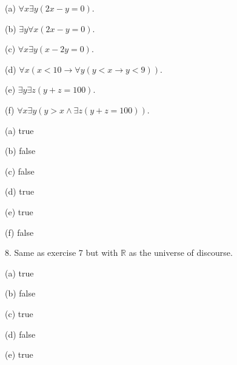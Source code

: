 \documentclass{article}
\begin{document}
\hspace{12pt}(a) $\forall x \exists y (2x - y = 0)$.

\hspace{12pt}(b) $\exists y \forall x (2x - y = 0)$.

\hspace{12pt}(c) $\forall x \exists y (x - 2y = 0)$.

\hspace{12pt}(d) $\forall x (x < 10 \to \forall y(y < x \to y < 9))$.

\hspace{12pt}(e) $\exists y \exists z (y + z = 100)$.

\hspace{12pt}(f) $\forall x \exists y (y > x \land \exists z (y + z = 100))$.
\vspace{30pt}

(a) true

\vspace{20pt}

(b) false

\vspace{20pt}

(c) false

\vspace{20pt}

(d) true

\vspace{20pt}

(e) true

\vspace{20pt}

(f) false

\vspace{30pt}

8. Same as exercise 7 but with $\mathbb{R}$ as the universe of discourse.
\vspace{30pt}

(a) true

\vspace{20pt}

(b) false

\vspace{20pt}

(c) true

\vspace{20pt}

(d) false

\vspace{20pt}

(e) true

\vspace{20pt}
\end{document}
